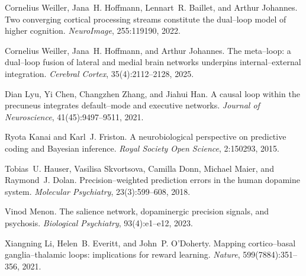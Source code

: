 \documentclass[11pt]{article}
\begin{document}

\begin{thebibliography}{99}

Cornelius Weiller, Jana~H. Hoffmann, Lennart~R. Baillet, and Arthur Johannes.
\newblock Two converging cortical processing streams constitute the dual--loop model of higher cognition.
\newblock \emph{NeuroImage}, 255:119190, 2022.

Cornelius Weiller, Jana~H. Hoffmann, and Arthur Johannes.
\newblock The meta--loop: a dual--loop fusion of lateral and medial brain networks underpins internal--external integration.
\newblock \emph{Cerebral Cortex}, 35(4):2112--2128, 2025.

Dian Lyu, Yi Chen, Changzhen Zhang, and Jiahui Han.
\newblock A causal loop within the precuneus integrates default--mode and executive networks.
\newblock \emph{Journal of Neuroscience}, 41(45):9497--9511, 2021.

Ryota Kanai and Karl~J. Friston.
\newblock A neurobiological perspective on predictive coding and Bayesian inference.
\newblock \emph{Royal Society Open Science}, 2:150293, 2015.

Tobias~U. Hauser, Vasilisa Skvortsova, Camilla Donn, Michael Maier, and Raymond~J. Dolan.
\newblock Precision--weighted prediction errors in the human dopamine system.
\newblock \emph{Molecular Psychiatry}, 23(3):599--608, 2018.

Vinod Menon.
\newblock The salience network, dopaminergic precision signals, and psychosis.
\newblock \emph{Biological Psychiatry}, 93(4):e1--e12, 2023.

Xiangning Li, Helen~B. Everitt, and John~P. O'Doherty.
\newblock Mapping cortico--basal ganglia--thalamic loops: implications for reward learning.
\newblock \emph{Nature}, 599(7884):351--356, 2021.

\end{thebibliography}
\end{document}
